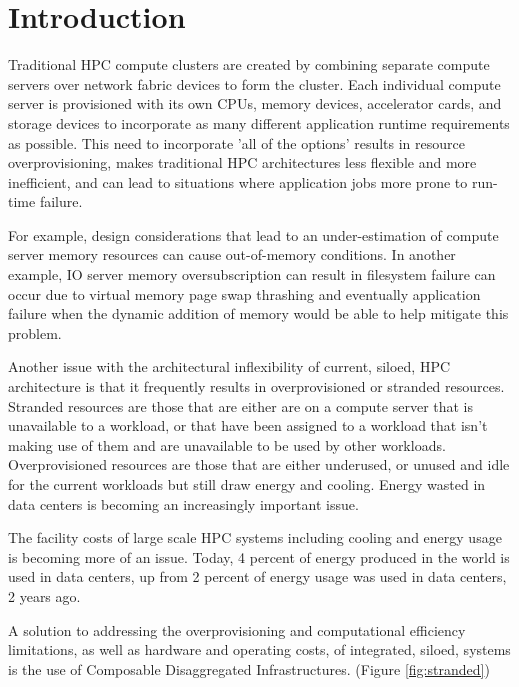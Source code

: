 \section{Introduction}

Traditional HPC compute clusters are created by combining separate compute servers over network fabric devices to form the cluster.  Each individual compute server is provisioned with its own CPUs, memory devices, accelerator cards, and storage devices to incorporate as many different application runtime requirements as possible.\cite{beowulf} This need to incorporate 'all of the options' results in resource overprovisioning, makes traditional HPC architectures less flexible and more inefficient, and can lead to situations where application jobs more prone to run-time failure.    

For example, design considerations that lead to an under-estimation of compute server memory resources can cause out-of-memory conditions.  In another example, IO server memory oversubscription can result in filesystem failure can occur due to virtual memory page swap thrashing and eventually application failure when the dynamic addition of memory would be able to help mitigate this problem.  

Another issue with the architectural inflexibility of current, siloed, HPC architecture is that it frequently results in overprovisioned or stranded resources.  Stranded resources are those that are either are on a compute server that is unavailable to a workload, or that have been assigned to a workload that isn't making use of them and are unavailable to be used by other workloads. Overprovisioned resources are those that are either underused, or unused and idle for the current workloads but still draw energy and cooling.  Energy wasted in data centers is becoming an increasingly important issue.\cite{eere}

The facility costs of large scale HPC systems including cooling and energy usage is becoming more of an issue. Today, 4 percent of energy produced in the world is used in data centers, up from 2 percent of energy usage was used in data centers, 2 years ago. \cite{dw} \cite{vmware} 

A solution to addressing the overprovisioning and computational efficiency limitations, as well as hardware and operating costs, of integrated, siloed, systems is the use of Composable Disaggregated Infrastructures. (Figure \ref{fig:stranded}) 

